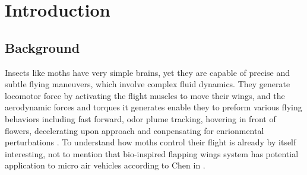 \documentclass[sigchi]{acmart}
\begin{document}
\maketitle

\section{Introduction}

\subsection{Background}




Insects like moths have very simple brains, yet they are capable of precise and subtle flying maneuvers, which involve complex fluid dynamics. They generate locomotor force by activating the flight muscles to move their wings, and the aerodynamic forces and torques it generates enable they to preform various flying behaviors including fast forward, odor plume tracking, hovering in front of flowers, decelerating upon approach and conpensating for enrionmental perturbations \cite{Stevenson1665}  \cite{Willis1991}
. To understand how moths control their flight is already by itself interesting, not to mention that  bio-inspired flapping wings system has potential application to micro air vehicles according to Chen in \cite{Chen_2018}. 
\end{document}
